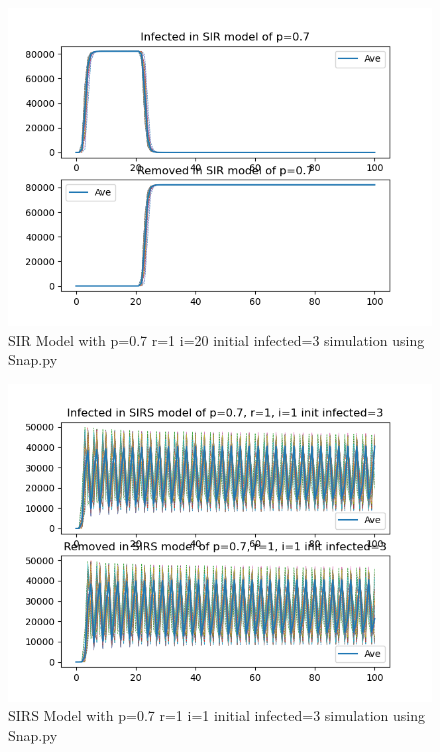 \documentclass{subfile}
\begin{document}
  \begin{figure}
  \includegraphics[scale=0.8]{sirp07r1i20s3}
  \caption[SIR p=0.7,r=1,i=20,init infected=3]{SIR Model with p=0.7 r=1 i=20 initial infected=3 simulation using Snap.py}
  \end{figure}
  \begin{figure}
  \includegraphics[scale=0.8]{sirsp07r1i1s3}
  \caption[SIRS p=0.7,r=1,i=1,init infected=3]{SIRS Model with p=0.7 r=1 i=1 initial infected=3 simulation using Snap.py}
  \end{figure}
\end{document}
